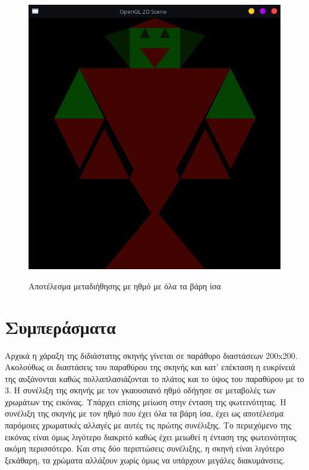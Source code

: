 \documentclass[12pt]{article}
\begin{document}
\begin{figure}[!h]
\centering
    {\includegraphics[width=1\textwidth]
    {robot_uniform_conv.png}}
    \caption{\label{fig:robotUniform} Αποτέλεσμα μεταδιήθησης με ηθμό με όλα τα βάρη ίσα}
\end{figure}
\clearpage

\section{Συμπεράσματα}
Αρχικά η χάραξη της διδιάστατης σκηνής γίνεται σε παράθυρο διαστάσεων 200x200. Ακολούθως οι διαστάσεις του παραθύρου της σκηνής και κατ’ επέκταση η ευκρίνειά της αυξάνονται καθώς πολλαπλασιάζονται το πλάτος και το ύψος του παραθύρου με το 3. Η συνέλιξη της σκηνής με τον γκαουσιανό ηθμό οδήγησε σε μεταβολές των χρωμάτων της εικόνας. Υπάρχει επίσης μείωση στην ένταση της φωτεινότητας. Η συνέλιξη της σκηνής με τον ηθμό που έχει όλα τα βάρη ίσα, έχει ως αποτέλεσμα παρόμοιες χρωματικές αλλαγές με αυτές τις πρώτης συνέλιξης. Το περιεχόμενο της εικόνας είναι όμως λιγότερο διακριτό καθώς έχει μειωθεί η ένταση της φωτεινότητας ακόμη περισσότερο. Και στις δύο περιπτώσεις συνέλιξης, η σκηνή είναι λιγότερο ξεκάθαρη, τα χρώματα αλλάζουν χωρίς όμως να υπάρχουν μεγάλες διακυμάνσεις.
\end{document}

